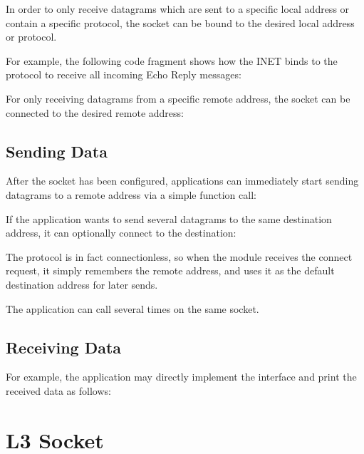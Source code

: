 In order to only receive  datagrams which are sent to a specific
local address or contain a specific protocol, the socket can be bound to the
desired local address or protocol.

For example, the following code fragment shows how the INET 
binds to the  protocol to receive all incoming
 Echo Reply messages:


For only receiving  datagrams from a specific remote address, the
socket can be connected to the desired remote address:


\subsection*{Sending Data}

After the socket has been configured, applications can immediately start sending
 datagrams to a remote address via a simple function call:


If the application wants to send several  datagrams to the same
destination address, it can optionally connect to the destination:


The  protocol is in fact connectionless, so when the
 module receives the connect request, it simply remembers the
remote address, and uses it as the default destination address for later sends.

The application can call  several times on the same socket.

\subsection*{Receiving Data}

For example, the application may directly implement the
 interface and print the received data as
follows:


\section{L3 Socket}
\label{sec:sockets:l3-socket}

